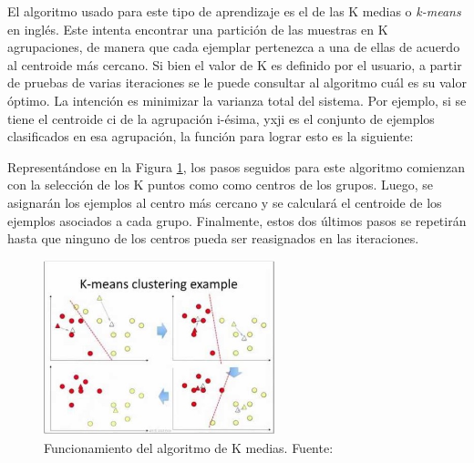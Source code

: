 \begin{itemize}
	El algoritmo usado para este tipo de aprendizaje es el de las K medias o \textit{k-means} en inglés. Este intenta encontrar una partición de las muestras en K agrupaciones, de manera que cada ejemplar pertenezca a una de ellas de acuerdo al centroide más cercano. Si bien el valor de K es definido por el usuario, a partir de pruebas de varias iteraciones se le puede consultar al algoritmo cuál es su valor óptimo. La intención es minimizar la varianza total del sistema. Por ejemplo, si se tiene el centroide ci de la agrupación i-ésima, yxji es el conjunto de ejemplos clasificados en esa agrupación, la función para lograr esto es la siguiente:
	
	Representándose en la Figura \ref{2:fig4}, los pasos seguidos para este algoritmo comienzan con la selección de los K puntos como como centros de los grupos. Luego, se asignarán los ejemplos al centro más cercano y se calculará el centroide de los ejemplos asociados a cada grupo. Finalmente, estos dos últimos pasos se repetirán hasta que ninguno de los centros pueda ser reasignados en las iteraciones.
	\begin{figure}[h]
		\begin{center}
			\includegraphics[width=0.6\textwidth]{2/figures/kmeans.jpg}
			\caption{Funcionamiento del algoritmo de K medias. Fuente: \cite{tec_sancho2018supnosup}}
			\label{2:fig4}
		\end{center}
	\end{figure}
		

\end{itemize}
